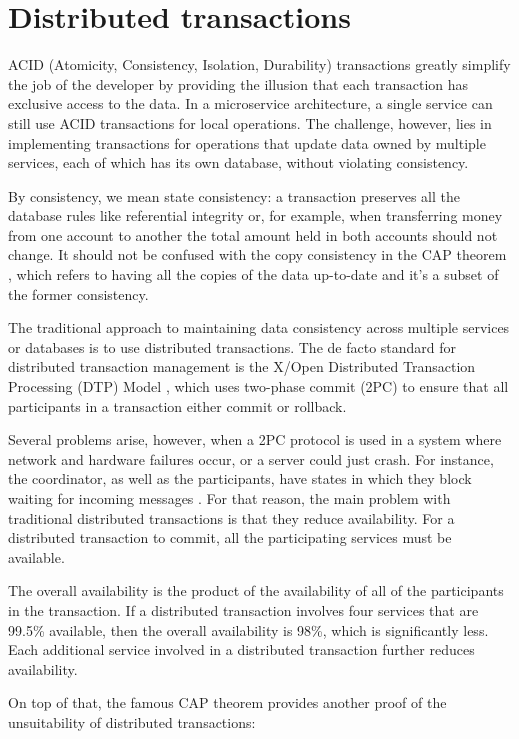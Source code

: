 \documentclass[conference]{IEEEtran}
\begin{document}
\section{Distributed transactions}

ACID (Atomicity, Consistency, Isolation, Durability) transactions greatly simplify the job of the developer by providing the illusion that each transaction has exclusive access to the data. In a microservice architecture, a single service can still use ACID transactions for local operations. The challenge, however, lies in implementing transactions for operations that update data owned by multiple services, each of which has its own database, without violating consistency.

By consistency, we mean state consistency: a transaction preserves all the database rules like referential integrity or, for example, when transferring money from one account to another the total amount held in both accounts should not change. It should not be confused with the copy consistency in the CAP theorem \cite{acid-cap}, which refers to having all the copies of the data up-to-date and it's a subset of the former consistency.

The traditional approach to maintaining data consistency across multiple services or databases is to use distributed transactions. The de facto standard for distributed transaction management is the X/Open Distributed Transaction Processing (DTP) Model \cite{dtp}, which uses two-phase commit (2PC) to ensure that all participants in a transaction either commit or rollback. 

Several problems arise, however, when a 2PC protocol is used in a system where network and hardware failures occur, or a server could just crash. For instance, the coordinator, as well as the participants, have states in which they block waiting for incoming messages \cite{distributed-systems-2pc}. For that reason, the main problem with traditional distributed transactions is that they reduce availability. For a distributed transaction to commit, all the participating services must be available.

The overall availability is the product of the availability of all of the participants in the transaction. If a distributed transaction involves four services that are 99.5\% available, then the overall availability is 98\%, which is significantly less. Each additional service involved in a distributed transaction further reduces availability.

On top of that, the famous CAP theorem provides another proof of the unsuitability of distributed transactions:
\end{document}
